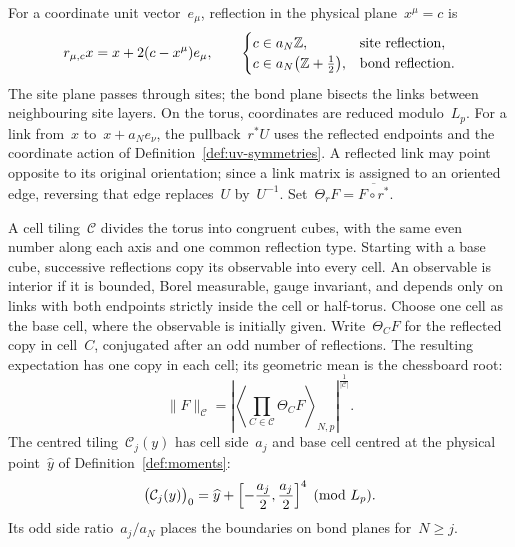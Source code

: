 \begin{definition}\label{def:iv-reflections}
For a coordinate unit vector~$e_\mu$, reflection in the physical plane~$x^\mu=c$ is
\begin{equation}\label{eq:iv-reflections}
 r_{\mu,c}x=x+2(c-x^\mu)e_\mu,\qquad
 \begin{cases}
 c\in a_N\mathbb Z,&\text{site reflection},\\
 c\in a_N\bigl(\mathbb Z+\frac{1}{2}\bigr),&\text{bond reflection}.
 \end{cases}
\end{equation}
The site plane passes through sites; the bond plane bisects the links between neighbouring site layers.
On the torus, coordinates are reduced modulo~$L_p$.
For a link from~$x$ to~$x+a_Ne_\nu$, the pullback~$r^*U$ uses the reflected endpoints and the coordinate action of Definition~\ref{def:uv-symmetries}. A reflected link may point opposite to its original orientation; since a link matrix is assigned to an oriented edge, reversing that edge replaces~$U$ by~$U^{-1}$.
Set~$\Theta_rF=\overline{F\circ r^*}$.

A cell tiling~$\mathcal C$ divides the torus into congruent cubes, with the same even number along each axis and one common reflection type. Starting with a base cube, successive reflections copy its observable into every cell.
An observable is interior if it is bounded, Borel measurable, gauge invariant, and depends only on links with both endpoints strictly inside the cell or half-torus.
Choose one cell as the base cell, where the observable is initially given.
Write~$\Theta_CF$ for the reflected copy in cell~$C$, conjugated after an odd number of reflections.
The resulting expectation has one copy in each cell; its geometric mean is the chessboard root:
\begin{equation}\label{eq:iv-root}
 \|F\|_{\mathcal C}
 =\left|\left\langle\prod_{C\in\mathcal C}\Theta_CF\right\rangle_{N,p}\right|^{\frac{1}{|\mathcal C|}}.
\end{equation}
The centred tiling~$\mathcal C_j(y)$ has cell side~$a_j$ and base cell centred at the physical point~$\widehat y$ of Definition~\ref{def:moments}:
\begin{equation*}
 \bigl(\mathcal C_j(y)\bigr)_0
 =\widehat y+\Bigl[-\frac{a_j}{2},\frac{a_j}{2}\Bigr]^4
 \pmod{L_p}.
\end{equation*}
Its odd side ratio~$a_j/a_N$ places the boundaries on bond planes for~$N\ge j$.
\end{definition}

